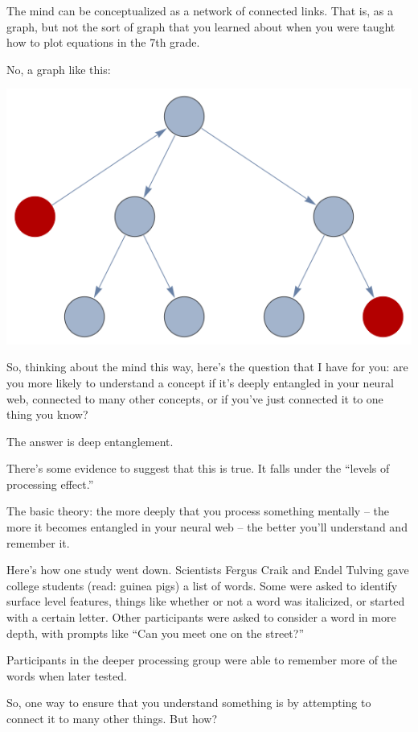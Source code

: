 The mind can be conceptualized as a network of connected links. That is, as a
graph, but not the sort of graph that you learned about when you were taught how to plot
equations in the 7th grade.

No, a graph like this:

\includegraphics[width=\textwidth]{graphics/graph.png}

So, thinking about the mind this way, here's the question that I have for you:
are you more likely to understand a concept if it's deeply entangled in your
neural web, connected to many other concepts, or if you've just
connected it to one thing you know?

The answer is deep entanglement.

There's some evidence to suggest that this is true. It falls under the ``levels
of processing effect.''

The basic theory: the more deeply that you process something mentally -- the more it
becomes entangled in your neural web -- the better you'll understand and remember
it.

Here's how one study went down. Scientists Fergus Craik and Endel Tulving gave
college students (read: guinea pigs) a list of words. Some were asked to identify surface level features, things like
whether or not a word was italicized, or started with a certain letter. Other
participants were asked to consider a word in more depth, with prompts like ``Can you meet
one on the street?''

Participants in the deeper processing group were able to remember more of the
words when later tested.\cite{craik1975depth}

So, one way to ensure that you understand something is by attempting to connect
it to many other things. But how?


